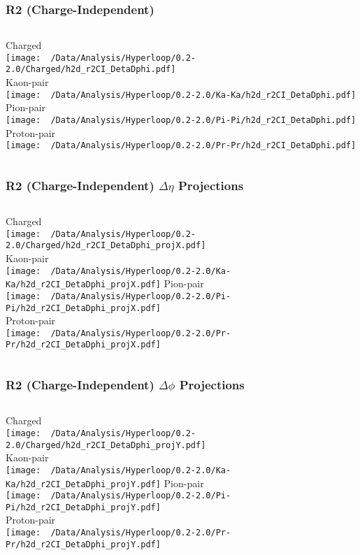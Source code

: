 \documentclass{beamer}
\begin{document}
\begin{frame}
	\frametitle{R2 (Charge-Independent)}
	\begin{columns}
		\centering
		Charged\\
		\texttt{[image: ~/Data/Analysis/Hyperloop/0.2-2.0/Charged/h2d\_r2CI\_DetaDphi.pdf]}\\Kaon-pair\\
		\texttt{[image: ~/Data/Analysis/Hyperloop/0.2-2.0/Ka-Ka/h2d\_r2CI\_DetaDphi.pdf]}
		\centering
		Pion-pair\\
		\texttt{[image: ~/Data/Analysis/Hyperloop/0.2-2.0/Pi-Pi/h2d\_r2CI\_DetaDphi.pdf]}\\Proton-pair\\
		\texttt{[image: ~/Data/Analysis/Hyperloop/0.2-2.0/Pr-Pr/h2d\_r2CI\_DetaDphi.pdf]}
	\end{columns}
\end{frame}
\begin{frame}
	\frametitle{R2 (Charge-Independent) $\Delta\eta$ Projections}
	\begin{columns}
		\column{0.5\textwidth}
		\centering
		Charged\\
		\texttt{[image: ~/Data/Analysis/Hyperloop/0.2-2.0/Charged/h2d\_r2CI\_DetaDphi\_projX.pdf]}\\Kaon-pair\\
		\texttt{[image: ~/Data/Analysis/Hyperloop/0.2-2.0/Ka-Ka/h2d\_r2CI\_DetaDphi\_projX.pdf]}
		\column{0.5\textwidth}
		\centering
		Pion-pair\\
		\texttt{[image: ~/Data/Analysis/Hyperloop/0.2-2.0/Pi-Pi/h2d\_r2CI\_DetaDphi\_projX.pdf]}\\Proton-pair\\
		\texttt{[image: ~/Data/Analysis/Hyperloop/0.2-2.0/Pr-Pr/h2d\_r2CI\_DetaDphi\_projX.pdf]}
	\end{columns}
\end{frame}
\begin{frame}
	\frametitle{R2 (Charge-Independent) $\Delta\phi$ Projections}
	\begin{columns}
		\centering
		Charged\\
		\texttt{[image: ~/Data/Analysis/Hyperloop/0.2-2.0/Charged/h2d\_r2CI\_DetaDphi\_projY.pdf]}\\Kaon-pair\\
		\texttt{[image: ~/Data/Analysis/Hyperloop/0.2-2.0/Ka-Ka/h2d\_r2CI\_DetaDphi\_projY.pdf]}
		\centering
		Pion-pair\\
		\texttt{[image: ~/Data/Analysis/Hyperloop/0.2-2.0/Pi-Pi/h2d\_r2CI\_DetaDphi\_projY.pdf]}\\Proton-pair\\
		\texttt{[image: ~/Data/Analysis/Hyperloop/0.2-2.0/Pr-Pr/h2d\_r2CI\_DetaDphi\_projY.pdf]}
	\end{columns}
\end{frame}
\end{document}
